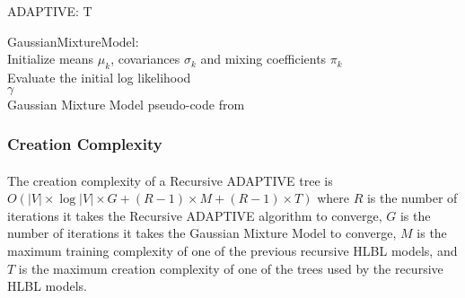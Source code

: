 \begin{algorithm}
\SetAlgoLined
ADAPTIVE:
\Return T
\end{algorithm}

\begin{algorithm} \label{code:GMM}
\SetAlgoLined
GaussianMixtureModel:
\\
Initialize means $\mu_k$, covariances $\sigma_k$ and mixing coefficients $\pi_k$
\\Evaluate the initial log likelihood
\\
\Return $\gamma$
\\
Gaussian Mixture Model pseudo-code from \cite{Bishop2006}
\end{algorithm} 

\subsubsection{Creation Complexity}
\paragraph{}
The creation complexity of a Recursive ADAPTIVE tree is $O ( |V| \times \log|V| \times G + (R-1)\times M + (R-1)\times T)$ where $R$ is the number of iterations it takes the Recursive ADAPTIVE algorithm to converge, $G$ is the number of iterations it takes the Gaussian Mixture Model to converge, $M$ is the maximum training complexity of one of the previous recursive HLBL models, and $T$ is the maximum creation complexity of one of the trees used by the recursive HLBL models. 

